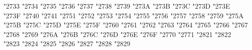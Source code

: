 {\Uchar\jis"2733 %
\Uchar\jis"2734 %
\Uchar\jis"2735 %
\Uchar\jis"2736 %
\Uchar\jis"2737 %
\Uchar\jis"2738 %
\Uchar\jis"2739 %
\Uchar\jis"273A %
\Uchar\jis"273B %
\Uchar\jis"273C %
\Uchar\jis"273D %
\Uchar\jis"273E %
\Uchar\jis"273F %
\Uchar\jis"2740 %
\Uchar\jis"2741 %
\Uchar\jis"2751 %
\Uchar\jis"2752 %
\Uchar\jis"2753 %
\Uchar\jis"2754 %
\Uchar\jis"2755 %
\Uchar\jis"2756 %
\Uchar\jis"2757 %
\Uchar\jis"2758 %
\Uchar\jis"2759 %
\Uchar\jis"275A %
\Uchar\jis"275B %
\Uchar\jis"275C %
\Uchar\jis"275D %
\Uchar\jis"275E %
\Uchar\jis"275F %
\Uchar\jis"2760 %
\Uchar\jis"2761 %
\Uchar\jis"2762 %
\Uchar\jis"2763 %
\Uchar\jis"2764 %
\Uchar\jis"2765 %
\Uchar\jis"2766 %
\Uchar\jis"2767 %
\Uchar\jis"2768 %
\Uchar\jis"2769 %
\Uchar\jis"276A %
\Uchar\jis"276B %
\Uchar\jis"276C %
\Uchar\jis"276D %
\Uchar\jis"276E %
\Uchar\jis"276F %
\Uchar\jis"2770 %
\Uchar\jis"2771 %
\Uchar\jis"2821 %
\Uchar\jis"2822 %
\Uchar\jis"2823 %
\Uchar\jis"2824 %
\Uchar\jis"2825 %
\Uchar\jis"2826 %
\Uchar\jis"2827 %
\Uchar\jis"2828 %
\Uchar\jis"2829 %
}

